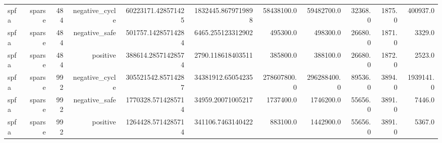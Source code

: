 \begin{table}[htbp]
\begin{tabular}{lrrrrrrrrrr}
spfa & sparse & 484 & negative_cycle & 60223171.428571425 & 1832445.8679719898 & 58438100.0 & 59482700.0 & 32368.0 & 1875.0 & 400937.0 \\
spfa & sparse & 484 & negative_safe & 501757.14285714284 & 6465.255123312902 & 495300.0 & 498300.0 & 26680.0 & 1871.0 & 3329.0 \\
spfa & sparse & 484 & positive & 388614.28571428574 & 2790.118618403511 & 385800.0 & 388100.0 & 26680.0 & 1872.0 & 2523.0 \\
spfa & sparse & 992 & negative_cycle & 305521542.85714287 & 34381912.65054235 & 278607800.0 & 296288400.0 & 89536.0 & 3894.0 & 1939141.0 \\
spfa & sparse & 992 & negative_safe & 1770328.5714285714 & 34959.20071005217 & 1737400.0 & 1746200.0 & 55656.0 & 3891.0 & 7446.0 \\
spfa & sparse & 992 & positive & 1264428.5714285714 & 341106.7463140422 & 883100.0 & 1442900.0 & 55656.0 & 3891.0 & 5367.0 \\
\hline
\end{tabular}
\end{table}

